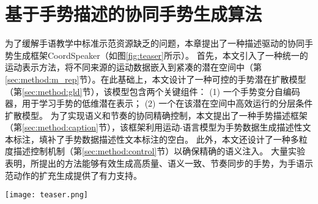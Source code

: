 
\chapter{基于手势描述的协同手势生成算法}
\label{sec:GG} 
为了缓解手语教学中标准示范资源缺乏的问题，本章提出了一种描述驱动的协同手势生成框架CoordSpeaker（如图\ref{fig:teaser}所示）。
首先，本文引入了一种统一的运动表示方法，将不同来源的运动数据嵌入到紧凑的潜在空间中（第\ref{sec:method:m_rep}节）。在此基础上，本文设计了一种可控的手势潜在扩散模型（第\ref{sec:method:gld}节），该模型包含两个关键组件：
(1) 一个手势变分自编码器，用于学习手势的低维潜在表示；
(2) 一个在该潜在空间中高效运行的分层条件扩散模型。
为了实现语义和节奏的协同精确控制，本文提出了一种手势描述框架（第\ref{sec:method:caption}节），该框架利用运动-语言模型为手势数据生成描述性文本标注，填补了手势数据描述性文本标注的空白。
此外，本文还设计了一种多粒度描述控制机制（第\ref{sec:method:control}节）以确保精确的语义注入。
大量实验表明，所提出的方法能够有效生成高质量、语义一致、节奏同步的手势，为手语示范动作的扩充生成提供了有力支持。

\begin{figure*}[!h]
  \centering
  \texttt{[image: teaser.png]}
  \caption{\textbf{CoordSpeaker} 支持手势描述和定制的协同说话者动作生成，既能与字幕保持语义一致，又能与音频保持节奏同步。例如，在演讲场景中，本文的方法允许说话者在讲话时自然地向前走并鞠躬，无缝地做出结束手势。} %
  \label{fig:teaser}
\end{figure*}

